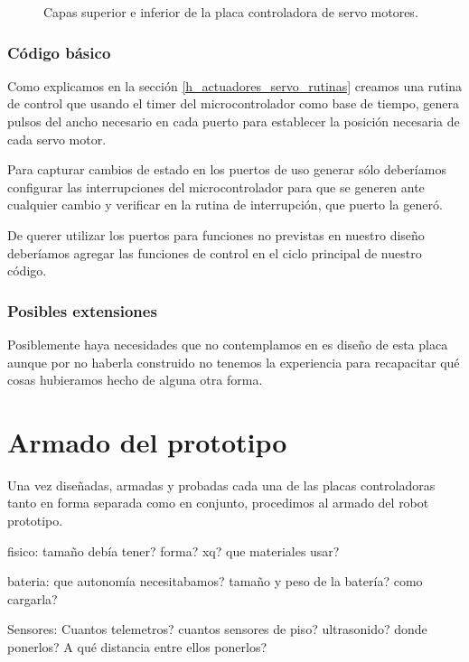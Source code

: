 \begin{figure}
	\caption{Capas superior e inferior de la placa controladora de servo motores.}
	\label{hF_placa_servo_capas}
\end{figure}

\subsubsection{C\'odigo b\'asico}
\label{h_placas_servos_codigo}

Como explicamos en la secci\'on \ref{h_actuadores_servo_rutinas} creamos una rutina de control
que usando el timer del microcontrolador como base de tiempo, genera pulsos del ancho necesario
en cada puerto para establecer la posici\'on necesaria de cada servo motor.

Para capturar cambios de estado en los puertos de uso generar s\'olo deber\'iamos configurar las
interrupciones del microcontrolador para que se generen ante cualquier cambio y verificar en la
rutina de interrupci\'on, que puerto la gener\'o.

De querer utilizar los puertos para funciones no previstas en nuestro dise\~no deber\'iamos
agregar las funciones de control en el ciclo principal de nuestro c\'odigo.

\subsubsection{Posibles extensiones}
\label{h_placas_servos_extensiones}

Posiblemente haya necesidades que no contemplamos en es dise\~no de esta placa aunque por no
haberla construido no tenemos la experiencia para recapacitar qu\'e cosas hubieramos hecho de
alguna otra forma.

\section{Armado del prototipo}
\label{h_prototipo}

Una vez dise\~nadas, armadas y probadas cada una de las placas controladoras tanto en forma separada
como en conjunto, procedimos al armado del robot prototipo.

fisico:
tama\~no deb\'ia tener? forma? xq?
que materiales usar?

bateria:
que autonom\'ia necesitabamos? 
tama\~no y peso de la bater\'ia? como cargarla?

Sensores:
Cuantos telemetros? cuantos sensores de piso? ultrasonido?
donde ponerlos? A qu\'e distancia entre ellos ponerlos?

